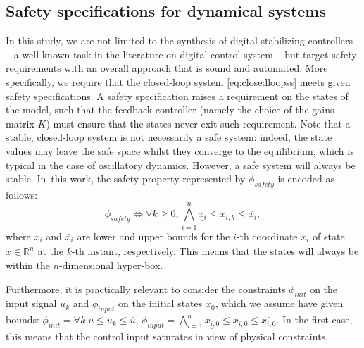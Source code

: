 \documentclass[runningheads,a4paper]{llncs}
\newcommand{\addtodo}[1]{{\color{red} TODO: #1}}
\begin{document}
\subsection{Safety specifications for dynamical systems}
\label{ssec:safety}

In this study, we are not limited to the synthesis of digital stabilizing
controllers -- a well known task in the literature on digital control system
-- but target safety requirements with an overall approach that is sound and
automated.  More specifically, we require that the closed-loop system
\eqref{eq:closedloopss} meets given safety specifications.  A safety
specification raises a requirement on the states of the model, such that the
feedback controller (namely the choice of the gains matrix $K$) must ensure that
the states never exit such requirement.  Note that a stable, closed-loop
system is not necessarily a safe system: indeed, the state values may leave
the safe space whilst they converge to the equilibrium, which is typical in
the case of oscillatory dynamics.  However, a safe system will always be
stable.  In~this work, the safety property represented by $\phi_{safety}$ is
encoded as follows:
%
\begin{equation}
\label{eq:safetyliteral}
\phi_{safety}\iff \forall k\geq 0, \bigwedge_{i=1}^{n}{\underline{x_{i}} \leq x_{i,k} \leq \overline{x_{i}}},
\end{equation}
%
%
where $\underline{x_{i}}$ and $\overline{x_{i}}$ are lower and upper bounds
for the $i$-th coordinate $x_{i}$ of state $x\in \mathbb R^n$ at the $k$-th
instant, respectively.  This means that the states will always be within the
$n$-dimensional hyper-box.

Furthermore, it is practically relevant to consider the 
constraints $\phi_{init}$ on the input
signal $u_{k}$ and $\phi_{input}$ on the initial states $x_0$,
which we assume have given bounds:
$\phi_{init} = {\forall k.\underline{u} \leq u_{k} \leq \overline{u}} $, 
$\phi_{input} = \bigwedge_{i=1}^{n} \underline{x_{i,0}} \leq x_{i,0} \leq \overline{x_{i,0}}.$
In the first case, this means that the control input saturates in view of
physical constraints.

\end{document}
